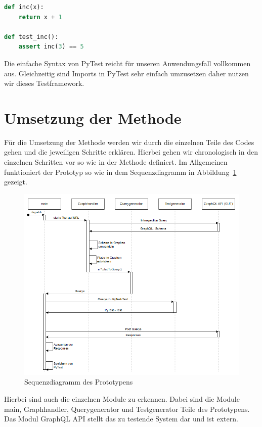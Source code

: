 \begin{lstlisting}[language=Python]
def inc(x):
    return x + 1

def test_inc():
    assert inc(3) == 5
\end{lstlisting}

Die einfache Syntax von PyTest reicht für unseren Anwendungsfall vollkommen aus.
Gleichzeitig sind Imports in PyTest sehr einfach umzusetzen daher nutzen wir dieses Testframework.
\newpage

\section{Umsetzung der Methode}

Für die Umsetzung der Methode werden wir durch die einzelnen Teile des Codes gehen und die jeweiligen Schritte erklären.
Hierbei gehen wir chronologisch in den einzelnen Schritten vor so wie in der Methode definiert.
Im Allgemeinen funktioniert der Prototyp so wie in dem Sequenzdiagramm in Abbildung~\ref{sqzd} gezeigt.

\begin{figure}[H]
    \begin{center}
        \includegraphics[width=\textwidth,height=\textheight,keepaspectratio]{img/sequenz}
    \end{center}
    \caption{Sequenzdiagramm des Prototypens}
    \label{sqzd}
\end{figure}

Hierbei sind auch die einzelnen Module zu erkennen.
Dabei sind die Module main, Graphhandler, Querygenerator und Testgenerator Teile des Prototypens.
Das Modul GraphQL API stellt das zu testende System dar und ist extern.

